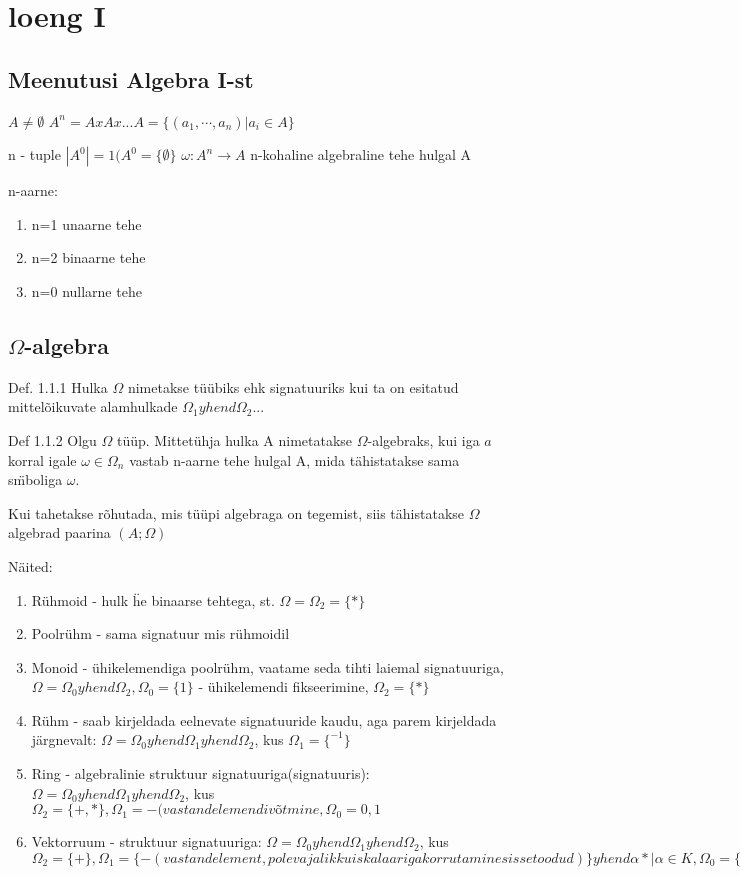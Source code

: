 \documentclass[12pt]{article}
\begin{document}
\section{loeng I}

\subsection{Meenutusi Algebra I-st}

$A \neq \emptyset$
$A^n = A x A x ... A = \{(a_1,\cdots,a_n)| a_i \in A \}$

n - tuple
$|A^0| = 1 (A^0 = \{ \emptyset \}$
$\omega: A^n \rightarrow A$ 
n-kohaline algebraline tehe hulgal A

n-aarne:
\begin{enumerate}
\item n=1 unaarne tehe
\item n=2 binaarne tehe
\item n=0 nullarne tehe
\end{enumerate}


\subsection{$\Omega$-algebra}

Def. 1.1.1 Hulka $\Omega$ nimetakse t\"u\"ubiks ehk signatuuriks kui ta on esitatud mittelõikuvate alamhulkade $\Omega_1 yhend \Omega_2...$

Def 1.1.2 Olgu $\Omega$ tüüp. Mittet\"uhja hulka A nimetatakse $\Omega$-algebraks, kui iga $a$ korral igale $\omega \in \Omega_n$ vastab n-aarne tehe hulgal A, mida tähistatakse sama s\"mboliga $\omega$. 

Kui tahetakse rõhutada, mis t\"u\"upi algebraga on tegemist, siis tähistatakse $\Omega$ algebrad paarina $(A;\Omega)$

Näited:

\begin{enumerate}
\item R\"uhmoid - hulk \"he binaarse tehtega, st. $\Omega= \Omega_2 = \{*\}$
\item Poolr\"uhm - sama signatuur mis r\"uhmoidil
\item Monoid - \"uhikelemendiga poolr\"uhm, vaatame seda tihti laiemal signatuuriga, $\Omega = \Omega_0 yhend \Omega_2, \Omega_0 = \{1\}$ - \"uhikelemendi fikseerimine, $\Omega_2 = \{*\}$
\item R\"uhm - saab kirjeldada eelnevate signatuuride kaudu, aga parem kirjeldada järgnevalt: $\Omega = \Omega_0 yhend \Omega_1 yhend \Omega_2$, kus $\Omega_1 = \{ ^{-1}\}$
\item Ring - algebralinie struktuur signatuuriga(signatuuris): $\Omega = \Omega_0 yhend \Omega_1 yhend \Omega_2$, kus $\Omega_2 = \{+,*\}, \Omega_1 = {-(vastandelemendi võtmine}, \Omega_0 = {0,1}$
\item Vektorruum - struktuur signatuuriga:
$\Omega = \Omega_0 yhend \Omega_1 yhend \Omega_2$, kus
$\Omega_2 = \{+\}, \Omega_1 = \{-(vastandelement, pole vajalik kui skalaariga korrutamine sissetoodud)\} yhend {\alpha * | \alpha \in K}, \Omega_0 = \{0\} - samuti avaldatav skalaariga korrutimase kaudu$ 
\end{enumerate}
\end{document}

